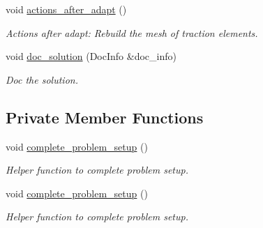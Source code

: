 \begin{DoxyCompactItemize}
void \hyperlink{classElasticAnnulusProblem_aa47beeedeac662b19c0f992daf77ef25}{actions\+\_\+after\+\_\+adapt} ()
\begin{DoxyCompactList}\small\item\em Actions after adapt\+: Rebuild the mesh of traction elements. \end{DoxyCompactList}\item 
void \hyperlink{classElasticAnnulusProblem_ab2952a8591047f62f9f66cfe29a533de}{doc\+\_\+solution} (Doc\+Info \&doc\+\_\+info)
\begin{DoxyCompactList}\small\item\em Doc the solution. \end{DoxyCompactList}\end{DoxyCompactItemize}
\subsection*{Private Member Functions}
\begin{DoxyCompactItemize}
\item 
void \hyperlink{classElasticAnnulusProblem_a06d509ff3316e5f3072ad5f9144cc33f}{complete\+\_\+problem\+\_\+setup} ()
\begin{DoxyCompactList}\small\item\em Helper function to complete problem setup. \end{DoxyCompactList}\item 
void \hyperlink{classElasticAnnulusProblem_a06d509ff3316e5f3072ad5f9144cc33f}{complete\+\_\+problem\+\_\+setup} ()
\begin{DoxyCompactList}\small\item\em Helper function to complete problem setup. \end{DoxyCompactList}\end{DoxyCompactItemize}
